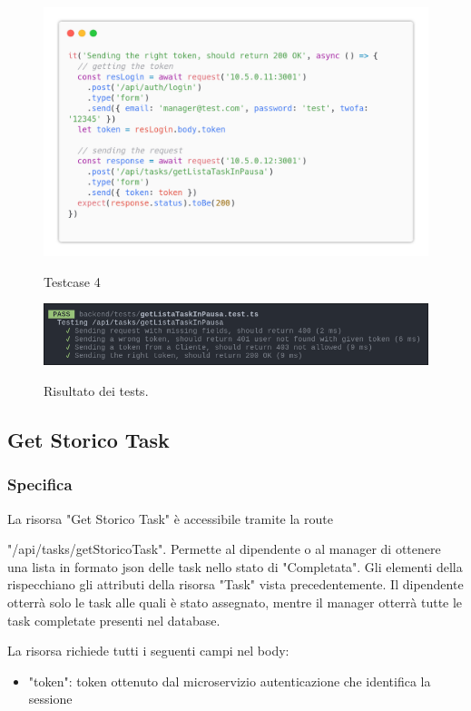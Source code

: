 \documentclass{report}
\begin{document}
\begin{figure}[H]
	\centering\includegraphics[width=1\textwidth]{images/code_in_pausa_test4.png}

	Testcase 4
\end{figure}

\begin{figure}[H]
	\centering\includegraphics[width=1\textwidth]{images/jest_in_pausa.png}

	Risultato dei tests.
\end{figure}

\subsection{Get Storico Task}
\subsubsection*{Specifica}

La risorsa "Get Storico Task" è accessibile tramite la route

"/api/tasks/getStoricoTask". Permette al dipendente o al manager di ottenere una lista in formato json delle task nello stato di "Completata". Gli elementi della rispecchiano gli attributi della risorsa "Task" vista precedentemente.
Il dipendente otterrà solo le task alle quali è stato assegnato, mentre il manager otterrà tutte le task completate presenti nel database.

La risorsa richiede tutti i seguenti campi nel body:
\begin{itemize}
	\item "token": token ottenuto dal microservizio autenticazione che identifica la sessione
\end{itemize}
\end{document}
